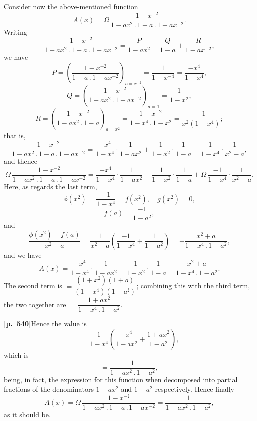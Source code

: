 \documentclass[11pt,a4paper]{article}
\begin{document}
Consider now the above-mentioned function
\[
A(x) = \Omega\,\frac{1 - x^{-2}}{1 - a x^{2}\,.\,1 - a\,.\,1 - a x^{-2}}.
\]
Writing
\[
\frac{1 - x^{-2}}{1 - a x^{2}\,.\,1 - a\,.\,1 - a x^{-2}} = \frac{P}{1 - a x^{2}} + \frac{Q}{1 - a} + \frac{R}{1 - a x^{-2}},
\]
we have
\[
P = \left(\frac{1 - x^{-2}}{1 - a\,.\,1 - a x^{-2}}\right)_{a = x^{-2}} = \frac{1}{1 - x^{-4}} = \frac{-x^{4}}{1 - x^{4}},
\]
\[
Q = \left(\frac{1 - x^{-2}}{1 - a x^{2}\,.\,1 - a x^{-2}}\right)_{a = 1} = \frac{1}{1 - x^{2}},
\]
\[
R = \left(\frac{1 - x^{-2}}{1 - a x^{2}\,.\,1 - a}\right)_{a = x^{2}} = \frac{1 - x^{-2}}{1 - x^{4}\,.\,1 - x^{2}} = \frac{-1}{x^{2}(1 - x^{4})};
\]
that is,
\[
\frac{1 - x^{-2}}{1 - a x^{2}\,.\,1 - a\,.\,1 - a x^{-2}} = \frac{-x^{4}}{1 - x^{4}}\cdot\frac{1}{1 - a x^{2}} + \frac{1}{1 - x^{2}}\cdot\frac{1}{1 - a} - \frac{1}{1 - x^{4}}\cdot\frac{1}{x^{2} - a},
\]
and thence
\[
\Omega\,\frac{1 - x^{-2}}{1 - a x^{2}\,.\,1 - a\,.\,1 - a x^{-2}} = \frac{-x^{4}}{1 - x^{4}}\cdot\frac{1}{1 - a x^{2}} + \frac{1}{1 - x^{2}}\cdot\frac{1}{1 - a} + \Omega\,\frac{-1}{1 - x^{4}}\cdot\frac{1}{x^{2} - a}.
\]
Here, as regards the last term,
\[
\phi(x^{2}) = \frac{-1}{1 - x^{4}} = f(x^{2}),\quad g(x^{2}) = 0,
\]
\[
f(a) = \frac{-1}{1 - a^{2}},
\]
and
\[
\frac{\phi(x^{2}) - f(a)}{x^{2} - a}
= \frac{1}{x^{2} - a}\left(\frac{-1}{1 - x^{4}} + \frac{1}{1 - a^{2}}\right)
= -\frac{x^{2} + a}{1 - x^{4}\,.\,1 - a^{2}},
\]
and we have
\[
A(x) = \frac{-x^{4}}{1 - x^{4}}\cdot\frac{1}{1 - a x^{2}} + \frac{1}{1 - x^{2}}\cdot\frac{1}{1 - a} - \frac{x^{2} + a}{1 - x^{4}\,.\,1 - a^{2}}.
\]
The second term is $= \dfrac{(1 + x^{2})(1 + a)}{(1 - x^{4})(1 - a^{2})}$; combining this with the third term, the two together are $= \dfrac{1 + a x^{2}}{1 - x^{4}\,.\,1 - a^{2}}$.

\bigskip

\noindent\textbf{[p.~540]}\quad Hence the value is
\[
= \frac{1}{1 - x^{4}}\left( \frac{-x^{4}}{1 - a x^{2}} + \frac{1 + a x^{2}}{1 - a^{2}} \right),
\]
which is
\[
= \frac{1}{1 - a x^{2}\,.\,1 - a^{2}},
\]
being, in fact, the expression for this function when decomposed into partial fractions of the denominators $1 - a x^{2}$ and $1 - a^{2}$ respectively. Hence finally
\[
A(x) = \Omega\,\frac{1 - x^{-2}}{1 - a x^{2}\,.\,1 - a\,.\,1 - a x^{-2}} = \frac{1}{1 - a x^{2}\,.\,1 - a^{2}},
\]
as it should be.
\end{document}
